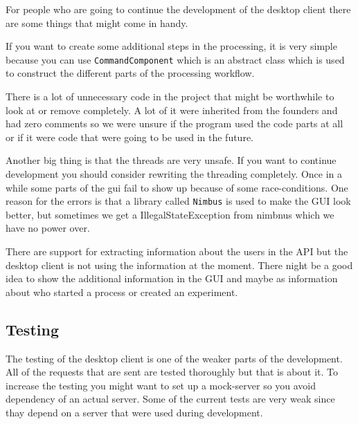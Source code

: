 For people who are going to continue the development of the desktop client there are some things that might come in handy.

If you want to create some additional steps in the processing, it is very simple because you can use \texttt{CommandComponent} which is an abstract class which is used to construct the different parts of the processing workflow.

There is a lot of unnecessary code in the project that might be worthwhile to look at or remove completely. A lot of it were inherited from the founders and had zero comments so we were unsure if the program used the code parts at all or if it were code that were going to be used in the future.

Another big thing is that the threads are very unsafe. If you want to continue development you should consider rewriting the threading completely. Once in a while some parts of the gui fail to show up because of some race-conditions. One reason for the errors is that a library called \texttt{Nimbus} is used to make the GUI look better, but sometimes we get a IllegalStateException from nimbnus which we have no power over.

 There are support for extracting information about the users in the API but the desktop client is not using the information at the moment. There night be a good idea to show the additional information in the GUI and maybe as information about who started a process or created an experiment.

\subsection{Testing}
The testing of the desktop client is one of the weaker parts of the development. All of the requests that are sent are tested thoroughly but that is about it. To increase the testing you might want to set up a mock-server so you avoid dependency of an actual server. Some of the current tests are very weak since thay depend on a server that were used during development. 
